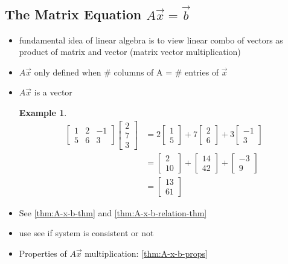 \documentclass[a4paper,12pt]{article}
\theoremstyle{definition}
\theoremstyle{definition}
\newtheorem{example}{Example}[subsection]
\begin{document}
	\subsection{The Matrix Equation $A\vec{x} = \vec{b}$}
	\begin{itemize}
		\item fundamental idea of linear algebra is to view linear combo of vectors as product of matrix and vector (matrix vector multiplication)
		
		\item $A\vec{x}$ only defined when \# columns of A = \# entries of $\vec{x}$
		
		\item $A\vec{x}$ is a vector
		
		\begin{example}
			\begin{align*}
				\begin{bmatrix}
					1 & 2 & -1\\
					5 & 6 & 3
				\end{bmatrix}
				\begin{bmatrix}
					2\\
					7\\
					3
				\end{bmatrix}&=
				2
				\begin{bmatrix}
					1\\
					5
				\end{bmatrix}
				+ 7
				\begin{bmatrix}
					2\\
					6
				\end{bmatrix}
				+ 3
				\begin{bmatrix}
					-1\\
					3
				\end{bmatrix}\\
				&=
				\begin{bmatrix}
					2\\
					10
				\end{bmatrix}
				+
				\begin{bmatrix}
					14\\
					42
				\end{bmatrix}
				+
				\begin{bmatrix}
					-3\\
					9
				\end{bmatrix}\\
				&=
				\begin{bmatrix}
					13\\
					61
				\end{bmatrix}
			\end{align*}
		\end{example}
		
		\item See \autoref{thm:A-x-b-thm} and \autoref{thm:A-x-b-relation-thm}
		
		\item use  see if system is consistent or not
		
		\item Properties of $A\vec{x}$ multiplication: \autoref{thm:A-x-b-props}
	\end{itemize}
	
\end{document}
